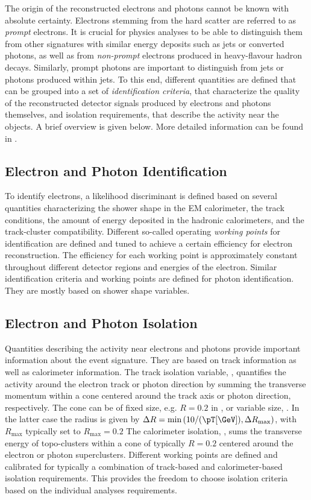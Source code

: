 The origin of the reconstructed electrons and photons cannot be known with absolute certainty. Electrons stemming from the hard scatter are referred to as \emph{prompt} electrons. It is crucial for physics analyses to be able to distinguish them from other signatures with similar energy deposits such as jets or converted photons, as well as from \emph{non-prompt} electrons produced in heavy-flavour hadron decays.
Similarly, prompt photons are important to distinguish from jets or photons produced within jets.
To this end, different quantities are defined that can be grouped into a set of \emph{identification criteria}, that characterize the quality of the reconstructed detector signals produced by electrons and photons themselves, and isolation requirements, that describe the activity near the objects. A brief overview is given below. More detailed information can be found in .

\subsection{Electron and Photon Identification}
To identify electrons, a likelihood discriminant is defined based on several quantities characterizing the shower shape in the EM calorimeter, the track conditions, the amount of energy deposited in the hadronic calorimeters, and the track-cluster compatibility. Different so-called operating \emph{working points} for identification are defined and tuned to achieve a certain efficiency for electron reconstruction. The efficiency for each working point is approximately constant throughout different detector regions and energies of the electron.
Similar identification criteria and working points are defined for photon identification. They are mostly based on shower shape variables.

\subsection{Electron and Photon Isolation}
Quantities describing the activity near electrons and photons provide important information about the event signature. They are based on track information as well as calorimeter information.
The track isolation variable, \pTcone, quantifies the activity around the electron track or photon direction by summing the transverse momentum within a cone centered around the track axis or photon direction, respectively. The cone can be of fixed size, e.g. $R=0.2$ in \pTconetwenty, or variable size, \pTvarcone. In the latter case the radius is given by $\Delta R = \text{min} \left( 10 / (\pT \text{[\GeV])}, \Delta R_{\text{max}}  \right)$, with $R_{\text{max}}$ typically set to $R_{\text{max}} = 0.2$
The calorimeter isolation, \ETconetwenty, sums the transverse energy of topo-clusters within a cone of typically $R=0.2$ centered around the electron or photon superclusters.
Different working points are defined and calibrated for typically a combination of track-based and calorimeter-based isolation requirements. This provides the freedom to choose isolation criteria based on the individual analyses requirements.

